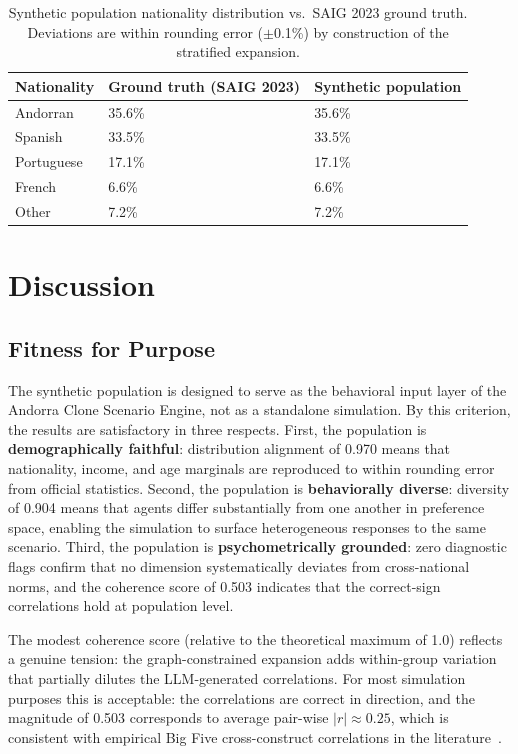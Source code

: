 \documentclass[sustainability,article,submit,pdftex,moreauthors]{Definitions/mdpi}
\begin{document}
\begin{table}[H]
\caption{Synthetic population nationality distribution vs.\ SAIG 2023
ground truth. Deviations are within rounding error ($\pm$0.1\%) by
construction of the stratified expansion.}
\label{tab:demographics}
\begin{tabularx}{\textwidth}{lXX}
\toprule
\textbf{Nationality} & \textbf{Ground truth (SAIG 2023)} & \textbf{Synthetic population} \\
\midrule
Andorran   & 35.6\% & 35.6\% \\
Spanish    & 33.5\% & 33.5\% \\
Portuguese & 17.1\% & 17.1\% \\
French     &  6.6\% &  6.6\% \\
Other      &  7.2\% &  7.2\% \\
\bottomrule
\end{tabularx}
\end{table}

\section{Discussion}
\label{sec:discussion}

\subsection{Fitness for Purpose}
\label{subsec:fitness}

The synthetic population is designed to serve as the behavioral input layer
of the Andorra Clone Scenario Engine, not as a standalone simulation.
By this criterion, the results are satisfactory in three respects.
First, the population is \textbf{demographically faithful}: distribution
alignment of 0.970 means that nationality, income, and age marginals are
reproduced to within rounding error from official statistics. Second, the
population is \textbf{behaviorally diverse}: diversity of 0.904 means that
agents differ substantially from one another in preference space, enabling
the simulation to surface heterogeneous responses to the same scenario.
Third, the population is \textbf{psychometrically grounded}: zero diagnostic
flags confirm that no dimension systematically deviates from cross-national
norms, and the coherence score of 0.503 indicates that the correct-sign
correlations hold at population level.

The modest coherence score (relative to the theoretical maximum of 1.0)
reflects a genuine tension: the graph-constrained expansion adds
within-group variation that partially dilutes the LLM-generated
correlations. For most simulation purposes this is acceptable: the
correlations are correct in direction, and the magnitude of 0.503
corresponds to average pair-wise $|r| \approx 0.25$, which is consistent
with empirical Big Five cross-construct correlations in the
literature~\cite{mccrae2003personality}.
\end{document}
